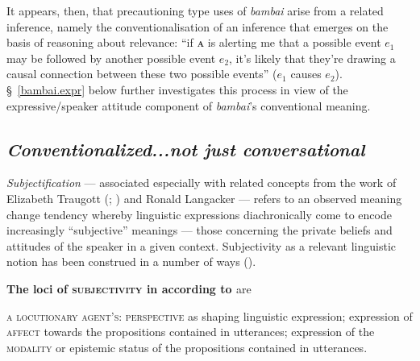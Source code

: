 
It appears, then, that precautioning type uses of \textit{bambai} arise from a related inference, namely the conventionalisation of an inference that emerges on the basis of reasoning about relevance: ``if \textsc{\textbf{a}} is alerting me that a possible event $ e_1 $ may be followed by another possible event $ e_2 $, it's likely that they're drawing a causal connection between these two possible events'' ($ e_1 $ causes $ e_2 $). \S~\ref{bambai.expr} below further investigates this process in view of the expressive/speaker attitude component of \textit{bambai}'s conventional meaning.

\subsection{\textit{Conventionalized...not just conversational}}

\textit{Subjectification} --- associated especially with related concepts from the work of Elizabeth Traugott (\citeyear[\textit{e.g.},][]{Traugott1989}; \citealp{Traugott2002}) and Ronald Langacker \citeyearpar[\textit{e.g.},][]{Langacker1989} --- refers to an observed meaning change tendency whereby linguistic expressions diachronically come to encode increasingly ``subjective'' meanings --- those concerning the private beliefs and attitudes of the speaker in a given context. Subjectivity as a relevant linguistic notion has been construed in a number of ways (\nextx).

\pex[labeltype=numeric] \textbf{The loci of \textsc{subjectivity} in according to \citet[4]{Finegan1995}} are

\textsc{a locutionary agent's:}
\a \textsc{perspective} as shaping linguistic expression;
\a expression of \textsc{affect} towards the propositions contained in utterances;
\a expression of the \textsc{modality} or epistemic status of the propositions contained in utterances.
\xe

